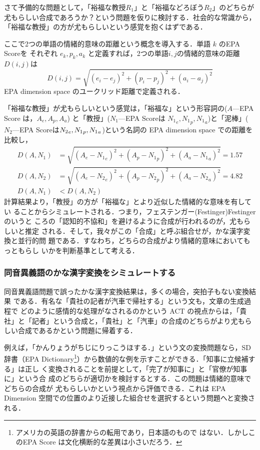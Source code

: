 \documentclass[japanese]{jnlp_1.3d}
\newcommand{\citep}{}
\begin{document}
さて予備的な問題として，「裕福な教授$R_1$」と「裕福などろぼう$R_2$」のどちらが尤もらしい合成であろうか？という問題を仮りに検討する．社会的な常識から，「裕福な教授」の方が尤もらしいという感覚を抱くはずである．

ここで2つの単語の情緒的意味の距離という概念を導入する．単語 $k$ のEPA Scoreを
それぞれ $e_k, p_k, a_k$ と定義すれば，2つの単語$i, j$の情緒的意味の距離$D(i,j)$は
\begin{equation}
 D(i,j) = \sqrt{(e_i - e_j)^2 + (p_i - p_j)^2 + (a_i - a_j)^2} 
\end{equation} 
EPA dimension space のユークリッド距離で定義される．

「裕福な教授」が尤もらしいという感覚は，「裕福な」という形容詞の($A$—EPA Score は，$A_e, A_p, A_a$) と「教授」($N_1$—EPA Scoreは
${N_1}_{e}, {N_1}_{p}, {N_1}_{a}$)と「泥棒」($N_2$—EPA Scoreは${N_2}_{e}, {N_1}_{p}, \linebreak
{N_1}_{a}$)という名詞の EPA dimension space での距離を比較し，
\begin{align}
 D(A, N_1) & = \sqrt{(A_e - {N_1}_e)^2 + (A_p - {N_1}_p)^2 + (A_a -
  {N_1}_a)^2}   =  1.57 \\
 D(A, N_2) & = \sqrt{(A_e - {N_2}_e)^2 + (A_p - {N_2}_p)^2 + (A_a -
  {N_2}_a)^2}   =  4.82 \\
 D(A, N_1) & < D(A, N_2)  \nonumber
\end{align}
計算結果より，「教授」の方が「裕福な」とより近似した情緒的な意味を有してい
ることからシミュレートされる．つまり，フェステンガー(Festinger)\citep{Festinger}のいうと
ころの「認知的不協和」を避けるように合成が行われるのが，尤もらしいと推定
される．そして，我々がこの「合成」と呼ぶ組合せが，かな漢字変換と並行的問
題である．すなわち，どちらの合成がより情緒的意味においてもっともらし
いかを判断基準として考える．



\subsubsection{同音異義語のかな漢字変換をシミュレートする}
同音異義語問題で誤ったかな漢字変換結果は，多くの場合，突拍子もない変換結果
である．有名な「貴社の記者が汽車で帰社する」という文も，文章の生成過程で
どのように感情的な処理がなされるのかという ACT の視点からは，「貴社」と「記者」という合成と，「貴社」と「汽車」の合成のどちらがより尤もらしい合成であるかという問題に帰着する．


例えば，「かんりょうがちじにりっこうほする．」という文の変換問題なら，SD
辞書（EPA Dictionary\footnote{アメリカの英語の辞書からの転用であり，日本語のもので
はない．しかしこのEPA Score は文化横断的な差異は小さいだろう．}）から数値的な例を示すことができる．「知事に立候補する」は正し
く変換されることを前提として，「完了が知事に」と「官僚が知事に」という合
成のどちらが適切かを検討するとする．この問題は情緒的意味でどちらの合成が
尤もらしいかという視点から評価できる．これは EPA Dimension 空間での位置のより近接した組合せを選択するという問題へと変換される．
\end{document}
